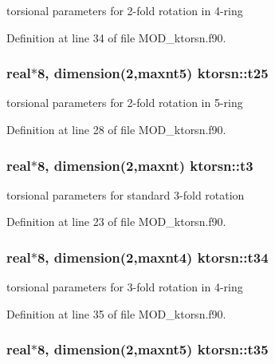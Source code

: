 torsional parameters for 2-\/fold rotation in 4-\/ring 



Definition at line 34 of file M\-O\-D\-\_\-ktorsn.\-f90.

\hypertarget{classktorsn_aafd204ef3dbe79b5a52495a0bd63f09b}{
\subsubsection[{t25}]{\setlength{\rightskip}{0pt plus 5cm}real$\ast$8, dimension(2,{\bf maxnt5}) ktorsn\-::t25}}\label{classktorsn_aafd204ef3dbe79b5a52495a0bd63f09b}


torsional parameters for 2-\/fold rotation in 5-\/ring 



Definition at line 28 of file M\-O\-D\-\_\-ktorsn.\-f90.

\hypertarget{classktorsn_a5c5d25c1cf83ab9ec82ec366e050c4aa}{
\subsubsection[{t3}]{\setlength{\rightskip}{0pt plus 5cm}real$\ast$8, dimension(2,{\bf maxnt}) ktorsn\-::t3}}\label{classktorsn_a5c5d25c1cf83ab9ec82ec366e050c4aa}


torsional parameters for standard 3-\/fold rotation 



Definition at line 23 of file M\-O\-D\-\_\-ktorsn.\-f90.

\hypertarget{classktorsn_a02592239a1249618f195b4bafd9b653c}{
\subsubsection[{t34}]{\setlength{\rightskip}{0pt plus 5cm}real$\ast$8, dimension(2,{\bf maxnt4}) ktorsn\-::t34}}\label{classktorsn_a02592239a1249618f195b4bafd9b653c}


torsional parameters for 3-\/fold rotation in 4-\/ring 



Definition at line 35 of file M\-O\-D\-\_\-ktorsn.\-f90.

\hypertarget{classktorsn_acdb4d85ecd7c07e138efbba63cd09bd7}{
\subsubsection[{t35}]{\setlength{\rightskip}{0pt plus 5cm}real$\ast$8, dimension(2,{\bf maxnt5}) ktorsn\-::t35}}\label{classktorsn_acdb4d85ecd7c07e138efbba63cd09bd7}


